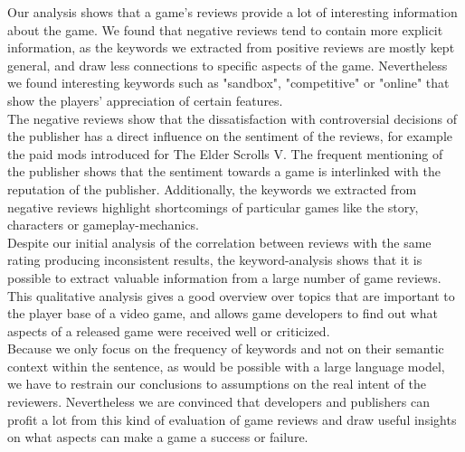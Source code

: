\documentclass{article}
\theoremstyle{plain}
\theoremstyle{definition}
\theoremstyle{remark}
\begin{document}
Our analysis shows that a game's reviews provide a lot of interesting information about the game. We found that negative reviews tend to contain more explicit information, as the keywords we extracted from positive reviews are mostly kept general, and draw less connections to specific aspects of the game. Nevertheless we found interesting keywords such as "sandbox", "competitive" or "online" that show the players' appreciation of certain features.\\
The negative reviews show that the dissatisfaction with controversial decisions of the publisher has a direct influence on the sentiment of the reviews, for example the paid mods introduced for The Elder Scrolls V. The frequent mentioning of the publisher shows that the sentiment towards a game is interlinked with the reputation of the publisher. Additionally, the keywords we extracted from negative reviews highlight shortcomings of particular games like the story, characters or gameplay-mechanics.\\
Despite our initial analysis of the correlation between reviews with the same rating producing inconsistent results, the keyword-analysis shows that it is possible to extract valuable information from a large number of game reviews. This qualitative analysis gives a good overview over topics that are important to the player base of a video game, and allows game developers to find out what aspects of a released game were received well or criticized.\\
Because we only focus on the frequency of keywords and not on their semantic context within the sentence, as would be possible with a large language model, we have to restrain our conclusions to assumptions on the real intent of the reviewers. 
Nevertheless we are convinced that developers and publishers can profit a lot from this kind of evaluation of game reviews and draw useful insights on what aspects can make a game a success or failure.
\end{document}
